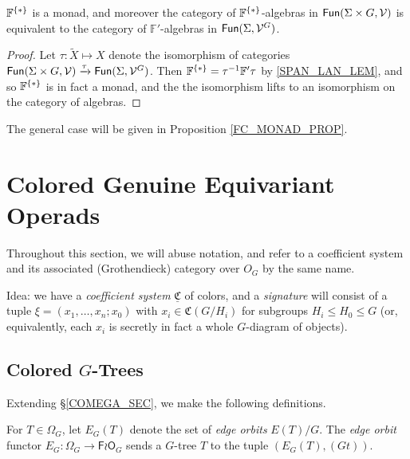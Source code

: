 \documentclass[a4paper,10pt
,draft
]{article}%
\renewcommand{\phi}{\varphi}
\newcommand{\UC}{\underline{\mathfrak C}}
\renewcommand{\1}{\ensuremath{\mathbb{id}}}
\begin{document}
\begin{proposition}
      \label{TEST_PROP}
      $\mathbb F^{\set{\**}}$ is a monad, and moreover
      the category of $\mathbb F^{\set{\**}}$-algebras in $\mathsf{Fun}(\Sigma \times G, \mathcal V)$ is equivalent to
      the category of $\mathbb F'$-algebras in $\mathsf{Fun}(\Sigma, \mathcal V^G)$.
\end{proposition}
\begin{proof}
      Let $\tau: \tilde X \mapsto X$ denote the isomorphism of categories
      $\mathsf{Fun}(\Sigma \times G, \mathcal V) \xrightarrow{\tau} \mathsf{Fun}(\Sigma, \mathcal V^G)$.
      Then $\mathbb F^{\set{\**}} = \tau^{-1} \mathbb F' \tau$ by \ref{SPAN_LAN_LEM}, and so
      $\mathbb F^{\set{\**}}$ is in fact a monad, and the
      the isomorphism lifts to an isomorphism on the category of algebras.
\end{proof}

The general case will be given in Proposition \ref{FC_MONAD_PROP}.





\newpage

\section{Colored Genuine Equivariant Operads}

Throughout this section, we will abuse notation, and refer to
a coefficient system and its associated (Grothendieck) category over $O_G$ by the same name.

Idea: we have a \textit{coefficient system} $\UC$ of colors, and
a \textit{signature} will consist of a tuple $\xi = (x_1, \dots, x_n;x_0)$
with $x_i \in \mathfrak C(G/H_i)$ for subgroups $H_i \leq H_0 \leq G$
(or, equivalently, each $x_i$ is secretly in fact a whole $G$-diagram of objects).

\subsection{Colored $G$-Trees}

Extending \S \ref{COMEGA_SEC}, we make the following definitions.

\begin{definition}
      \label{EG_DEFN}
      For $T \in \Omega_G$, let $E_G(T)$ denote the set of \textit{edge orbits} $E(T)/G$.
      The \textit{edge orbit} functor $E_G: \Omega_G \to \mathsf F \wr \mathsf O_G$ sends a $G$-tree $T$ to
      the tuple $(E_G(T), (Gt))$.
\end{definition}
\end{document}
